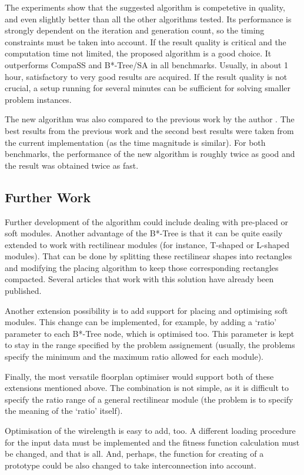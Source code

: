 The experiments show that the suggested algorithm is competetive in quality, and even slightly better than all the other algorithms tested. Its performance is strongly dependent on the iteration and generation count, so the timing constraints must be taken into account. If the result quality is critical and the computation time not limited, the proposed algorithm is a good choice. It outperforms CompaSS \cite{bench} and B*-Tree/SA \cite{btreesa} in all benchmarks. Usually, in about 1 hour, satisfactory to very good results are acquired. If the result quality is not crucial, a setup running for several minutes can be sufficient for solving smaller problem instances.

The new algorithm was also compared to the previous work by the author \cite{vh}. The best results from the previous work and the second best results were taken from the current implementation (as the time magnitude is similar). For both benchmarks, the performance of the new algorithm is roughly twice as good and the result was obtained twice as fast.

\subsection{Further Work}

Further development of the algorithm could include dealing with pre-placed or soft modules. Another advantage of the B*-Tree is that it can be quite easily extended to work with rectilinear modules (for instance, T-shaped or L-shaped modules). That can be done by splitting these rectilinear shapes into rectangles and modifying the placing algorithm to keep those corresponding rectangles compacted. Several articles that work with this solution have already been published.

Another extension possibility is to add support for placing and optimising soft modules. This change can be implemented, for example, by adding a `ratio' parameter to each B*-Tree node, which is optimised too. This parameter is kept to stay in the range specified by the problem assignement (usually, the problems specify the minimum and the maximum ratio allowed for each module).

Finally, the most versatile floorplan optimiser would support both of these extensions mentioned above. The combination is not simple, as it is difficult to specify the ratio range of a general rectilinear module (the problem is to specify the meaning of the `ratio' itself).

Optimisation of the wirelength is easy to add, too. A different loading procedure for the input data must be implemented and the fitness function calculation must be changed, and that is all. And, perhaps, the function for creating of a prototype could be also changed to take interconnection into account.
